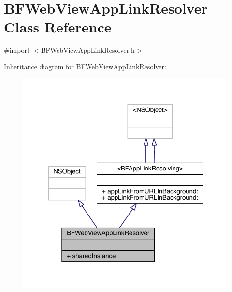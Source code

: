 \hypertarget{interface_b_f_web_view_app_link_resolver}{\section{B\-F\-Web\-View\-App\-Link\-Resolver Class Reference}
\label{interface_b_f_web_view_app_link_resolver}
}


{\ttfamily \#import $<$B\-F\-Web\-View\-App\-Link\-Resolver.\-h$>$}



Inheritance diagram for B\-F\-Web\-View\-App\-Link\-Resolver\-:
\nopagebreak
\begin{figure}[H]
\begin{center}
\leavevmode
\includegraphics[width=323pt]{interface_b_f_web_view_app_link_resolver__inherit__graph}
\end{center}
\end{figure}


